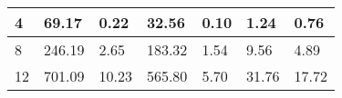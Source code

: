 \begin{table}
\begin{tabular}{|l|l|l|l|l|l|l|}
4                                                                                   & 69.17                                                                                                                    & 0.22                                                                                                                                       & 32.56                                                                                                                                        & 0.10                                                                                                                                        & 1.24                                                                                                                                      & 0.76                                                                                                                                      \\ \hline
8                                                                                   & 246.19                                                                                                                    & 2.65                                                                                                                                        & 183.32                                                                                                                                        & 1.54                                                                                                                                         & 9.56                                                                                                                                     & 4.89                                                                                                                                       \\ \hline
12                                                                                  & 701.09                                                                                                                    & 10.23                                                                                                                                        & 565.80                                                                                                                                        & 5.70                                                                                                                                           & 31.76                                                                                                                                     & 17.72                                                                                                                                       \\ \hline

\end{tabular}
\end{table}
